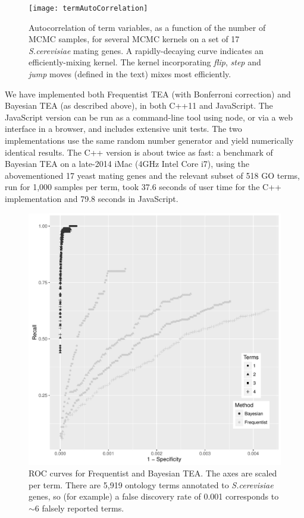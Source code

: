 \begin{figure}
\texttt{[image: termAutoCorrelation]}
\caption{
  \label{fig:termauto}
  Autocorrelation of term variables, as a function of the number of MCMC samples, for several MCMC kernels on a set of 17 {\em S.cerevisiae} mating genes.
  A rapidly-decaying curve indicates an efficiently-mixing kernel.
  The kernel incorporating {\em flip}, {\em step} and {\em jump} moves (defined in the text) mixes most efficiently.
}
\end{figure}

We have implemented both Frequentist TEA (with Bonferroni correction) and Bayesian TEA (as described above), in both C++11 and JavaScript.
The JavaScript version can be run as a command-line tool using node, or via a web interface in a browser, and includes extensive unit tests.
The two implementations use the same random number generator and yield numerically identical results.
The C++ version is about twice as fast:
a benchmark of Bayesian TEA on a late-2014 iMac (4GHz Intel Core i7),
using the abovementioned 17 yeast mating genes and the relevant subset of 518 GO terms, run for 1,000 samples per term,
took 37.6 seconds of user time for the C++ implementation and 79.8 seconds in JavaScript.

\begin{figure}
\includegraphics[width=\columnwidth]{allsim.pdf}
\caption{
  \label{fig:simresults}
  ROC curves for Frequentist and Bayesian TEA. The axes are scaled per term.
  There are 5,919 ontology terms annotated to {\em S.cerevisiae} genes, so (for example)
  a false discovery rate of 0.001 corresponds to $\sim$6 falsely reported terms.
}
\end{figure}

